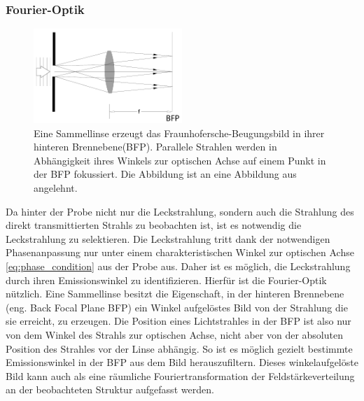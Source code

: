 \documentclass[titlepage]{article}
\begin{document}
	\subsubsection{Fourier-Optik}
	\label{sec:fourier}
	\begin{figure}[htbp] 
		\centering
		\includegraphics[width=0.5\textwidth]{figures/FourierLinse.pdf}
		\caption{Eine Sammellinse erzeugt das Fraunhofersche-Beugungsbild in ihrer hinteren Brennebene(BFP). Parallele Strahlen werden in Abhängigkeit ihres Winkels zur optischen Achse auf einem Punkt in der BFP fokussiert. Die Abbildung ist an eine Abbildung aus \cite{Hecht.2018} angelehnt.}
		\label{fig:FourierLinse}
	\end{figure}
	Da hinter der Probe nicht nur die Leckstrahlung, sondern auch die Strahlung des direkt transmittierten Strahls zu beobachten ist, ist es notwendig die Leckstrahlung zu selektieren. Die Leckstrahlung tritt dank der notwendigen Phasenanpassung nur unter einem charakteristischen Winkel zur optischen Achse \eqref{eq:phase_condition} aus der Probe aus. Daher ist es möglich, die Leckstrahlung durch ihren Emissionswinkel zu identifizieren. Hierfür ist die Fourier-Optik nützlich. Eine Sammellinse besitzt die Eigenschaft, in  der hinteren Brennebene (eng. Back Focal Plane BFP) ein Winkel aufgelöstes Bild von der Strahlung die sie erreicht, zu erzeugen\cite{Hecht.1996}. Die Position eines Lichtstrahles in der BFP ist also nur von dem Winkel des Strahls zur optischen Achse, nicht aber von der absoluten Position des Strahles vor der Linse abhängig. So ist es möglich gezielt bestimmte Emissionswinkel in der BFP aus dem Bild herauszufiltern. Dieses winkelaufgelöste Bild kann auch als eine räumliche Fouriertransformation der Feldstärkeverteilung an der beobachteten Struktur aufgefasst werden. 
	
\end{document}

